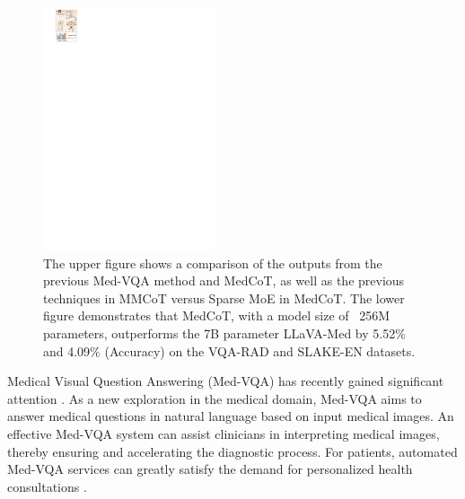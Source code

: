 \documentclass[11pt]{article}
\begin{document}
\begin{figure}[t!]
\centering
\includegraphics[width=0.45\textwidth]{image/Figure_1_v7.pdf}
\caption{
The upper figure shows a comparison of the outputs from the previous Med-VQA method and MedCoT, as well as the previous techniques in MMCoT \cite{zhang2023multimodal} versus Sparse MoE in MedCoT.
The lower figure demonstrates that MedCoT, with a model size of ~256M parameters, outperforms the 7B parameter LLaVA-Med by 5.52\% and 4.09\% (Accuracy) on the VQA-RAD and SLAKE-EN datasets. 
} 
\label{fig1}
\end{figure}

Medical Visual Question Answering (Med-VQA) has recently gained significant attention \cite{chen2022align, gong2021cross, ren2020cgmvqa, khare2021mmbert}. As a new exploration in the medical domain, Med-VQA aims to answer medical questions in natural language based on input medical images. An effective Med-VQA system can assist clinicians in interpreting medical images, thereby ensuring and accelerating the diagnostic process. For patients, automated Med-VQA services can greatly satisfy the demand for personalized health consultations \cite{liu2023parameter}.
\end{document}
